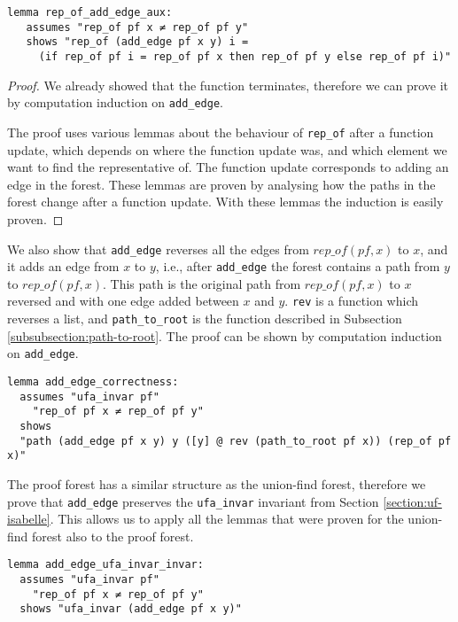 \begin{lstlisting}
lemma rep_of_add_edge_aux:
   assumes "rep_of pf x ≠ rep_of pf y"
   shows "rep_of (add_edge pf x y) i =
     (if rep_of pf i = rep_of pf x then rep_of pf y else rep_of pf i)"
\end{lstlisting}

\begin{proof}
We already showed that the function terminates, therefore we can prove it by computation induction on \lstinline{add_edge}.

The proof uses various lemmas about the behaviour of \lstinline{rep_of} after a function update, which depends on where the function update was, and which element we want to find the representative of.
The function update corresponds to adding an edge in the forest.
These lemmas are proven by analysing how the paths in the forest change after a function update.
With these lemmas the induction is easily proven.
\end{proof}

We also show that \lstinline|add_edge| reverses all the edges from $rep\_of(pf,x)$ to $x$, and it adds an edge from $x$ to $y$, i.e., after \lstinline|add_edge| the forest contains a path from $y$ to $rep\_of(pf,x)$. This path is the original path from $rep\_of(pf,x)$ to $x$ reversed and with one edge added between $x$ and $y$. \lstinline|rev| is a function which reverses a list, and \lstinline|path_to_root| is the function described in Subsection \ref{subsubsection:path-to-root}. The proof can be shown by computation induction on \lstinline|add_edge|.

\begin{lstlisting}
lemma add_edge_correctness:
  assumes "ufa_invar pf"
    "rep_of pf x ≠ rep_of pf y"
  shows
  "path (add_edge pf x y) y ([y] @ rev (path_to_root pf x)) (rep_of pf x)"
\end{lstlisting}

The proof forest has a similar structure as the union-find forest, therefore we prove that \lstinline|add_edge| preserves the \lstinline|ufa_invar| invariant from Section \ref{section:uf-isabelle}. This allows us to apply all the lemmas that were proven for the union-find forest also to the proof forest.

\begin{lstlisting}
lemma add_edge_ufa_invar_invar:
  assumes "ufa_invar pf"
    "rep_of pf x ≠ rep_of pf y"
  shows "ufa_invar (add_edge pf x y)"
\end{lstlisting}

